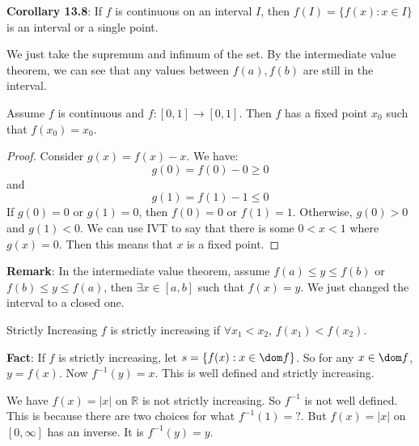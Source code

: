 \documentclass{report}
\begin{document}
\textbf{Corollary 13.8}: If $f$ is continuous on an interval $I$, then $f(I) = \{f(x) : x \in I\}$ is an interval or a single point. 

We just take the supremum and infimum of the set. By the intermediate value theorem, we can see that any values between $f(a), f(b)$ are still in the interval.

\begin{examples}
    \begin{example}
        Assume $f$ is continuous and $f: [0, 1] \rightarrow [0, 1]$. Then $f$ has a fixed point $x_{0}$ such that $f(x_{0}) = x_{0}$.
            \begin{proof}
                Consider $g(x) = f(x) - x$. We have:
                    \begin{equation*}
                        g(0) = f(0) - 0 \geq 0
                    \end{equation*}
                and 
                    \begin{equation*}
                        g(1) = f(1) - 1 \leq 0
                    \end{equation*}
                If $g(0) = 0$ or $g(1) = 0$, then $f(0) = 0$ or $f(1) = 1$. Otherwise, $g(0) > 0$ and $g(1) < 0$. We can use IVT to say that there is some $0 < x < 1$ where $g(x) = 0$. Then this means that $x$ is a fixed point.
            \end{proof}
    \end{example}
\end{examples}

\textbf{Remark}: In the intermediate value theorem, assume $f(a) \leq y \leq f(b)$ or $f(b) \leq y \leq f(a)$, then $\exists x \in [a, b]$ such that $f(x) = y$. We just changed the interval to a closed one.

\begin{definition}{Strictly Increasing}
    $f$ is strictly increasing if $\forall x_{1} < x_{2}$, $f(x_{1}) < f(x_{2})$.
\end{definition}

\textbf{Fact}: If $f$ is strictly increasing, let $s = \{f(x) : x \in \dom f\}$. So for any $x \in \dom f$, $y = f(x)$. Now $f^{-1}(y) = x$. This is well defined and strictly increasing.

\begin{examples}
    \begin{example}
        We have $f(x) = \lvert x \rvert$ on $\mathbb{R}$ is not strictly increasing. So $f^{-1}$ is not well defined. This is because there are two choices for what $f^{-1}(1) = ?$. But $f(x) = \lvert x \rvert$ on $[0, \infty]$ has an inverse. It is $f^{-1}(y) = y$.
    \end{example}
\end{examples}
\end{document}
